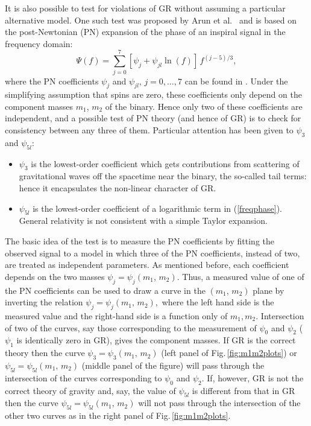 It is also possible to test for violations of GR without assuming a 
particular alternative model.  One such test was proposed by 
Arun et al.~\cite{testGR:2006,testGR:2007,testGR:2010} and is
based on the post-Newtonian (PN) expansion of the phase of an inspiral 
signal in the frequency domain:
\begin{equation}
\Psi(f) = \sum_{j=0}^7 \left[\psi_j + 
\psi_{jl}\ln(f)\right]\,f^{(j-5)/3},
\label{freqphase}
\end{equation}
where the PN coefficients $\psi_j$ and $\psi_{jl}$,
$j = 0, \ldots, 7$ can be found in \cite{testGR:2010}.
Under the simplifying assumption that spins are zero, these 
coefficients only depend on the component masses $m_1$, $m_2$ of
the binary. Hence only two of these coefficients
are independent, and a possible test of PN theory 
(and hence of GR) is to check for consistency between any three of 
them. Particular attention has been given to $\psi_3$ and $\psi_{5l}$:
\begin{itemize}
\item $\psi_3$ is the lowest-order coefficient which gets contributions from scattering of gravitational
waves off the spacetime near the binary, the so-called tail terms: hence it encapsulates the non-linear
character of GR.
\item $\psi_{5l}$ is the lowest-order coefficient of a logarithmic term in (\ref{freqphase}). General
relativity is not consistent with a simple Taylor expansion.
\end{itemize}
The basic idea of the test is to measure the PN coefficients by fitting the 
observed signal to a model in which three of the PN coefficients, 
instead of two, are treated as independent parameters. As mentioned 
before, each coefficient depends on the two masses $\psi_j=\psi_j(m_1,\,m_2).$
Thus, a measured value of one of the PN coefficients can be used to
draw a curve in the $(m_1,\,m_2)$ plane by inverting the relation
$\psi_j=\psi_j(m_1,\,m_2),$ where the left hand side is the measured value
and the right-hand side is a function only of $m_1, m_2.$ Intersection of
two of the curves, say those corresponding to the measurement of 
$\psi_0$ and $\psi_2$ ($\psi_1$ is identically zero in GR),
gives the component masses. If GR is the correct theory then the curve 
$\psi_3=\psi_3(m_1,\,m_2)$ (left panel of Fig.\,\ref{fig:m1m2plots}) or
$\psi_{5l}=\psi_{5l}(m_1,\,m_2)$ (middle panel of the figure)
will pass through the intersection of the curves corresponding
to $\psi_0$ and $\psi_2.$ If, however, GR is not the correct theory of 
gravity and, say, the value of $\psi_{5l}$ is different from 
that in GR then the curve $\psi_{5l} = \psi_{5l}(m_1,\,m_2)$ will 
not pass through the intersection of the other two curves as in the 
right panel of Fig.\,\ref{fig:m1m2plots}.

